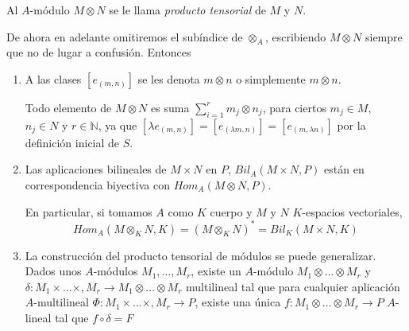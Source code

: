 \documentclass[../main.tex]{subfiles}
\begin{document}
\begin{definition}
  Al $A$-módulo $M\otimes N$ se le llama \emph{producto tensorial} de $M$ y $N$.
\end{definition}

\begin{remark}
De ahora en adelante omitiremos el subíndice de $\otimes_A$, escribiendo $M \otimes N$ siempre que no de lugar a confusión. Entonces
\begin{enumerate}
  \item A las clases $[e_{(m,n)}]$ se les denota $m\otimes n$ o simplemente $m\otimes n$.

  Todo elemento de $M\otimes N$ es suma $\sum_{i=1}^rm_j\otimes n_j$, para ciertos $m_j\in M$, $n_j\in N$ y $r\in\mathbb{N}$, ya que $[\lambda e_{(m,n)}]=[e_{(\lambda m,n)}]=[e_{(m,\lambda n)}]$ por la definición inicial de $S$.

  \item Las aplicaciones bilineales de $M\times N$ en $P$, $Bil_A(M\times N,P)$ están en correspondencia biyectiva con $Hom_A(M\otimes N,P)$.

  En particular, si tomamos $A$ como $K$ cuerpo y $M$ y $N$ $K$-espacios vectoriales,$$Hom_A(M\otimes_KN,K)=(M\otimes_KN)^{\ast}=Bil_K(M\times N,K)$$

  \item La construcción del producto tensorial de módulos se puede generalizar. Dados unos $A$-módulos $M_1,\dots,M_r$, existe un $A$-módulo $M_1\otimes \dots\otimes M_r$ y $\delta:M_1\times\dots\times,M_r\longrightarrow M_1\otimes \dots\otimes M_r$ multilineal tal que para cualquier aplicación $A$-multilineal $\Phi:M_1\times\dots\times,M_r\longrightarrow P$, existe una única $f:M_1\otimes \dots\otimes M_r\longrightarrow P$ $A$-lineal tal que $f\circ\delta=F$

\end{enumerate}
\end{remark}
\end{document}
